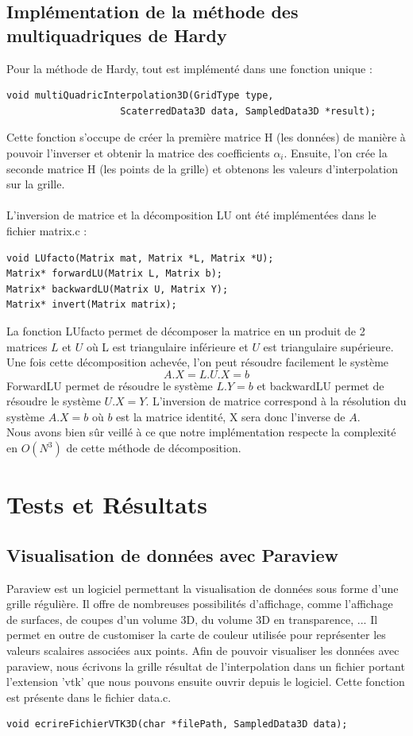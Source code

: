 \documentclass[a4paper,9pt]{article}
\begin{document}
\subsection{Implémentation de la méthode des multiquadriques de Hardy}
\label{subsec:hardy_implementation}
Pour la méthode de Hardy, tout est implémenté dans une fonction unique :
\begin{verbatim}
void multiQuadricInterpolation3D(GridType type, 
                    ScaterredData3D data, SampledData3D *result);
\end{verbatim}
Cette fonction s'occupe de créer la première matrice H (les données) de manière à pouvoir l'inverser et obtenir la matrice des coefficients $\alpha_{i}$. Ensuite, l'on crée la seconde matrice H (les points de la grille) et obtenons les valeurs d'interpolation sur la grille.\\\\
L'inversion de matrice et la décomposition LU ont été implémentées dans le fichier matrix.c :
\begin{verbatim}
void LUfacto(Matrix mat, Matrix *L, Matrix *U);
Matrix* forwardLU(Matrix L, Matrix b);
Matrix* backwardLU(Matrix U, Matrix Y);
Matrix* invert(Matrix matrix);
\end{verbatim}
La fonction LUfacto permet de décomposer la matrice en un produit de 2 matrices $L$ et $U$ où L est triangulaire inférieure et $U$ est triangulaire supérieure. Une fois cette décomposition achevée, l'on peut résoudre facilement le système $$A.X=L.U.X=b$$ ForwardLU permet de résoudre le système $L.Y=b$ et backwardLU permet de résoudre le système $U.X=Y$. L'inversion de matrice correspond à la résolution du système $A.X=b$ où $b$ est la matrice identité, X sera donc l'inverse de $A$.\\
Nous avons bien sûr veillé à ce que notre implémentation respecte la complexité en $O(N^{3})$ de cette méthode de décomposition.

\section{Tests et Résultats}
\label{sec:tests_resultats}

\subsection{Visualisation de données avec Paraview}
\label{subsec:paraview}
Paraview est un logiciel permettant la visualisation de données sous forme d'une grille régulière. Il offre de nombreuses possibilités d'affichage, comme l'affichage de surfaces, de coupes d'un volume 3D, du volume 3D en transparence, ... Il permet en outre de customiser la carte de couleur utilisée pour représenter les valeurs scalaires associées aux points. Afin de pouvoir visualiser les données avec paraview, nous écrivons la grille résultat de l'interpolation dans un fichier portant l'extension 'vtk' que nous pouvons ensuite ouvrir depuis le logiciel. Cette fonction est présente dans le fichier data.c.
\begin{verbatim}
void ecrireFichierVTK3D(char *filePath, SampledData3D data);
\end{verbatim}
\end{document}
